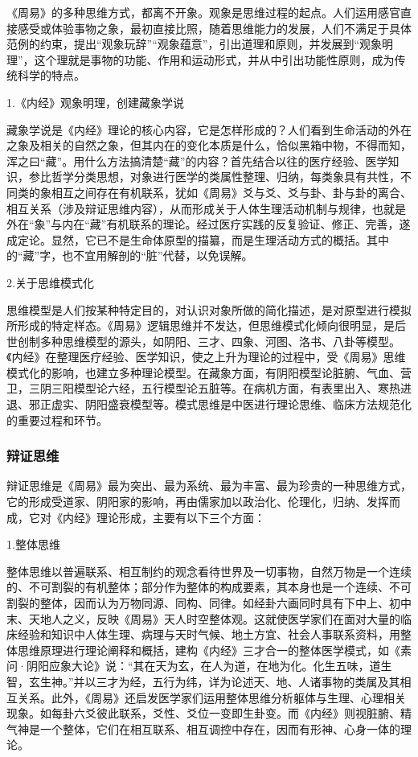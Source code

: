 \documentclass[draft,12pt]{ctexbook}
\begin{document}
《周易》的多种思维方式，都离不开象。观象是思维过程的起点。人们运用感官直接感受或体验事物之象，最初直接比照，随着思维能力的发展，人们不满足于具体范例的约束，提出“观象玩辞”“观象蕴意”，引出道理和原则，并发展到“观象明理”，这个理就是事物的功能、作用和运动形式，并从中引出功能性原则，成为传统科学的特点。

1.《内经》观象明理，创建藏象学说

藏象学说是《内经》理论的核心内容，它是怎样形成的？人们看到生命活动的外在之象及相关的自然之象，但其内在的变化本质是什么，恰似黑箱中物，不得而知，浑之曰“藏”。用什么方法搞清楚“藏”的内容？首先结合以往的医疗经验、医学知识，参比哲学分类思想，对象进行医学的类属性整理、归纳，每类象具有共性，不同类的象相互之间存在有机联系，犹如《周易》爻与爻、爻与卦、卦与卦的离合、相互关系（涉及辩证思维内容），从而形成关于人体生理活动机制与规律，也就是外在“象”与内在“藏”有机联系的理论。经过医疗实践的反复验证、修正、完善，遂成定论。显然，它已不是生命体原型的描纂，而是生理活动方式的概括。其中的“藏”字，也不宜用解剖的“脏”代替，以免误解。

2.关于思维模式化

思维模型是人们按某种特定目的，对认识对象所做的简化描述，是对原型进行模拟所形成的特定样态。《周易》逻辑思维并不发达，但思维模式化倾向很明显，是后世创制多种思维模型的源头，如阴阳、三才、四象、河图、洛书、八卦等模型。《内经》在整理医疗经验、医学知识，使之上升为理论的过程中，受《周易》思维模式化的影响，也建立多种理论模型。在藏象方面，有阴阳模型论脏腑、气血、营卫，三阴三阳模型论六经，五行模型论五脏等。在病机方面，有表里出入、寒热进退、邪正虚实、阴阳盛衰模型等。模式思维是中医进行理论思维、临床方法规范化的重要过程和环节。

\subsubsection{辩证思维}%

辩证思维是《周易》最为突出、最为系统、最为丰富、最为珍贵的一种思维方式，它的形成受道家、阴阳家的影响，再由儒家加以政治化、伦理化，归纳、发挥而成，它对《内经》理论形成，主要有以下三个方面：

1.整体思维

整体思维以普遍联系、相互制约的观念看待世界及一切事物，自然万物是一个连续的、不可割裂的有机整体；部分作为整体的构成要素，其本身也是一个连续、不可割裂的整体，因而认为万物同源、同构、同律。如经卦六画同时具有下中上、初中末、天地人之义，反映《周易》天人时空整体观。这就使医学家们在面对大量的临床经验和知识中人体生理、病理与天时气候、地土方宜、社会人事联系资料，用整体思维原理进行理论阐释和概括，建构《内经》三才合一的整体医学模式，如《素问·阴阳应象大论》说：“其在天为玄，在人为道，在地为化。化生五味，道生智，玄生神。”并以三才为经，五行为纬，详为论述天、地、人诸事物的类属及其相互关系。此外，《周易》还启发医学家们运用整体思维分析躯体与生理、心理相关现象。如每卦六爻彼此联系，爻性、爻位一变即生卦变。而《内经》则视脏腑、精气神是一个整体，它们在相互联系、相互调控中存在，因而有形神、心身一体的理论。
\end{document}
